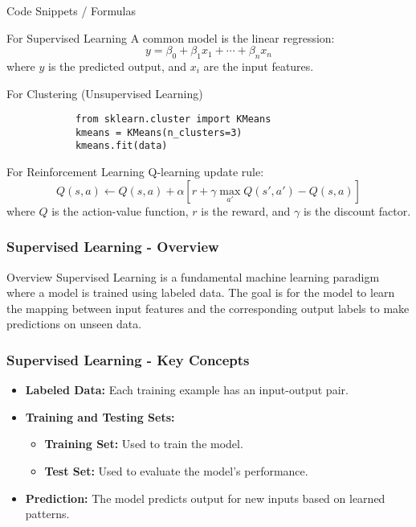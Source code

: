 \documentclass[aspectratio=169]{beamer}
\begin{document}
\begin{frame}[fragile]{Code Snippets / Formulas}
    \begin{block}{For Supervised Learning}
        A common model is the linear regression:
        \begin{equation}
            y = \beta_0 + \beta_1 x_1 + \cdots + \beta_n x_n
        \end{equation}
        where $y$ is the predicted output, and $x_i$ are the input features.
    \end{block}

    \begin{block}{For Clustering (Unsupervised Learning)}
        \begin{lstlisting}
            from sklearn.cluster import KMeans
            kmeans = KMeans(n_clusters=3)
            kmeans.fit(data)
        \end{lstlisting}
    \end{block}

    \begin{block}{For Reinforcement Learning}
        Q-learning update rule:
        \begin{equation}
            Q(s, a) \leftarrow Q(s, a) + \alpha \left[ r + \gamma \max_{a'} Q(s', a') - Q(s, a) \right]
        \end{equation}
        where $Q$ is the action-value function, $r$ is the reward, and $\gamma$ is the discount factor.
    \end{block}
\end{frame}

\begin{frame}
    \frametitle{Supervised Learning - Overview}
    \begin{block}{Overview}
        Supervised Learning is a fundamental machine learning paradigm where a model is trained using labeled data. The goal is for the model to learn the mapping between input features and the corresponding output labels to make predictions on unseen data.
    \end{block}
\end{frame}

\begin{frame}
    \frametitle{Supervised Learning - Key Concepts}
    \begin{itemize}
        \item \textbf{Labeled Data:} Each training example has an input-output pair.
        \item \textbf{Training and Testing Sets:}
        \begin{itemize}
            \item \textbf{Training Set:} Used to train the model.
            \item \textbf{Test Set:} Used to evaluate the model's performance.
        \end{itemize}
        \item \textbf{Prediction:} The model predicts output for new inputs based on learned patterns.
    \end{itemize}
\end{frame}
\end{document}
